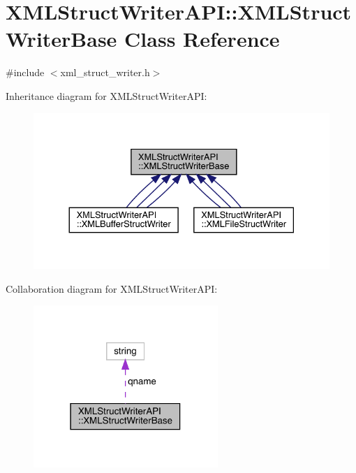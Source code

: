 \hypertarget{classXMLStructWriterAPI_1_1XMLStructWriterBase}{}\section{X\+M\+L\+Struct\+Writer\+A\+PI\+:\+:X\+M\+L\+Struct\+Writer\+Base Class Reference}
\label{classXMLStructWriterAPI_1_1XMLStructWriterBase}


{\ttfamily \#include $<$xml\+\_\+struct\+\_\+writer.\+h$>$}



Inheritance diagram for X\+M\+L\+Struct\+Writer\+A\+PI\+:
\nopagebreak
\begin{figure}[H]
\begin{center}
\leavevmode
\includegraphics[width=330pt]{d6/dc3/classXMLStructWriterAPI_1_1XMLStructWriterBase__inherit__graph}
\end{center}
\end{figure}


Collaboration diagram for X\+M\+L\+Struct\+Writer\+A\+PI\+:\nopagebreak
\begin{figure}[H]
\begin{center}
\leavevmode
\includegraphics[width=198pt]{df/dcd/classXMLStructWriterAPI_1_1XMLStructWriterBase__coll__graph}
\end{center}
\end{figure}
